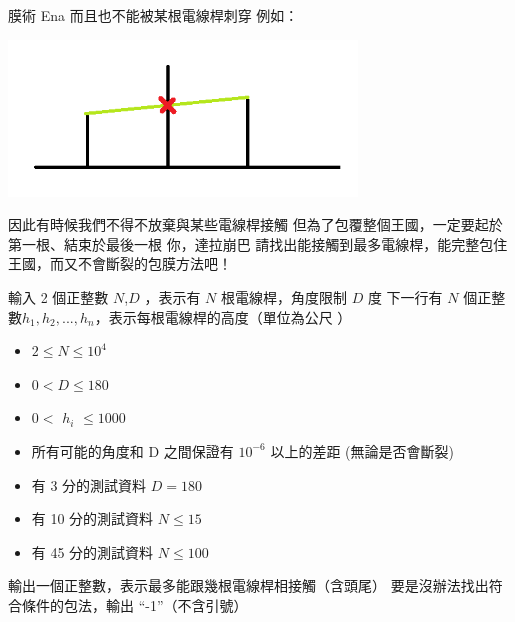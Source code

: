 \begin{problem}{膜術 Ena}
而且也不能被某根電線桿刺穿\newline
例如：\newline

\centerline{\includegraphics[width=25em]{./pics/D-3.png}}

因此有時候我們不得不放棄與某些電線桿接觸\newline
但為了包覆整個王國，一定要起於第一根、結束於最後一根\newline
\newline
\newline
你，達拉崩巴\newline
請找出能接觸到最多電線桿，能完整包住王國，而又不會斷裂的包膜方法吧！\newline

\InputFile

輸入 2 個正整數 $N$,$D$ ，表示有 $N$ 根電線桿，角度限制 $D$ 度 \newline
下一行有 $N$ 個正整數$h_1,h_2,...,h_n$，表示每根電線桿的高度（單位為公尺 ）\newline

\begin{iofmt}
\begin{itemize}
	\item $2 \leq N \leq 10^4$
    \item $0 < D \leq 180$
    \item $0 <$ $h_i$ $\leq 1000 $
	\item 所有可能的角度和 D 之間保證有 $10^{-6}$ 以上的差距 (無論是否會斷裂) 
    \item 有 3 分的測試資料 $ D = 180 $
	\item 有 10 分的測試資料 $N \leq 15$
	\item 有 45 分的測試資料 $N \leq 100$
\end{itemize}
\end{iofmt}

\OutputFile

輸出一個正整數，表示最多能跟幾根電線桿相接觸（含頭尾）\newline
要是沒辦法找出符合條件的包法，輸出 ``-1''（不含引號）\newline


\end{problem}
